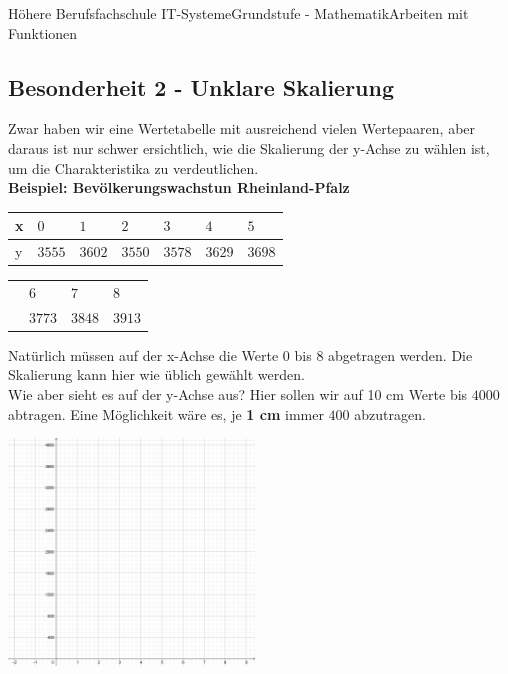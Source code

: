 \documentclass[11pt,twocolumn,oneside,openany,headings=optiontotoc,11pt,numbers=noenddot]{article}
\begin{document}
\begin{worksheet}{Höhere Berufsfachschule IT-Systeme}{Grundstufe - Mathematik}{Arbeiten mit Funktionen}
		\subsection{Besonderheit 2 - Unklare Skalierung}
		Zwar haben wir eine Wertetabelle mit ausreichend vielen Wertepaaren, aber daraus ist nur schwer ersichtlich, wie die Skalierung der y-Achse zu wählen ist, um die Charakteristika zu verdeutlichen.\\
		\textbf{Beispiel: Bevölkerungswachstun Rheinland-Pfalz}\\
		\begin{tabularx}{0.49\textwidth}{|l|l|l|l|l|l|l|}
			\hline
			x & \(0\) & \(1\) & \(2\) & \(3\) & \(4\) & \(5\)\\
			\hline
			y & \(3555\) & \(3602\) & \(3550\) & \(3578\) & \(3629\) & \(3698\)\\
			\hline
		\end{tabularx}
		\par\bigskip\noindent
		\begin{tabularx}{0.5\textwidth}{l|l|l|l|}
			\cline{2-4}
			& \(6\) & \(7\) & \(8\)\\
			\cline{2-4}
			& \(3773\) & \(3848\) & \(3913\)\\
			\cline{2-4}
		\end{tabularx}
		\par\bigskip\noindent
		Natürlich müssen auf der x-Achse die Werte 0 bis 8 abgetragen werden. Die Skalierung kann hier wie üblich gewählt werden.\\
		Wie aber sieht es auf der y-Achse aus? Hier sollen wir auf 10 cm Werte bis \(4000\) abtragen. Eine Möglichkeit wäre es, je \textbf{1 cm} immer \(400\) abzutragen.\\
		\par\bigskip\noindent
		\includegraphics[width=0.49\textwidth]{../99_Bilder/b2Koord.jpg}\\
		\par\bigskip\noindent

\end{worksheet}
\end{document}
